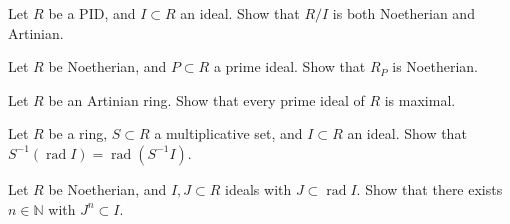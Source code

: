 \documentclass{problemset}
\DeclareMathOperator{\rad}{rad}
\begin{document}
\begin{exercise}Let \(R\) be a PID, and \(I \subset R\) an ideal.  Show that \(R/I\) is both Noetherian and Artinian.
\end{exercise}


\begin{exercise}Let \(R\) be Noetherian, and \(P \subset R\) a prime ideal.  Show that \(R_P\) is Noetherian.
\end{exercise}



\begin{exercise}
Let \(R\) be an Artinian ring.  Show that every prime ideal of \(R\) is maximal.
\end{exercise}


\begin{exercise}Let \(R\) be a ring, \(S \subset R\) a multiplicative set, and \(I \subset R\) an ideal.  Show that \(S^{-1}(\rad I) = \rad(S^{-1}I)\).
\end{exercise}


\begin{exercise}Let \(R\) be Noetherian, and \(I,J \subset R\) ideals with \(J \subset \rad I\).  Show that there exists \(n \in \mathbb{N}\) with \(J^n \subset I\).
\end{exercise}







\end{document}
